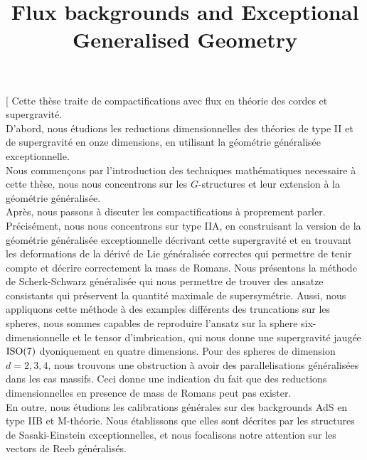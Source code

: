 \documentclass[draft]{phd}
\begin{document}
	\title[Solutions avec flux et Géométrie Généralisée Exceptionnelle]{Flux backgrounds and Exceptional Generalised Geometry}
	\abstract[%
			Cette thèse traite de compactifications avec flux en théorie des cordes et supergravité.\\
			D'abord, nous étudions les reductions dimensionnelles des théories de type II et de supergravité en onze dimensions, en utilisant la géométrie généralisée exceptionnelle.\\
			Nous commençons par l'introduction des techniques mathématiques necessaire à cette thèse, nous nous concentrons sur les $G$-structures et leur extension à la géométrie généralisée.\\
			Après, nous passons à discuter les compactifications à proprement parler.
			Précisément, nous nous concentrons sur type IIA, en construisant la version de la géométrie généralisée exceptionnelle décrivant cette supergravité et en trouvant les deformations de la dérivé de Lie généralisée correctes qui permettre de tenir compte et décrire correctement la mass de Romans.
			Nous présentons la méthode de Scherk-Schwarz généralisée qui nous permettre de trouver des ansatze consistants qui préservent la quantité maximale de supersymétrie.
			Aussi, nous appliquons cette méthode à des examples différents des truncations sur les spheres, nous sommes capables de reproduire l'ansatz sur la sphere six-dimensionnelle et le tensor d'imbrication, qui nous donne une supergravité jaugée $\mathrm{ISO}(7)$ dyoniquement  en quatre dimensions.
			Pour des spheres de dimension $d=2,3,4$, nous trouvons une obstruction à avoir des parallelisations généralisées dans les cas massifs. 
			Ceci donne une indication du fait que des reductions dimensionnelles en presence de mass de Romans peut pas exister.\\
			En outre, nous étudions les calibrations générales sur des backgrounds AdS en type IIB et M-théorie.
			Nous établissons que elles sont décrites par les structures de Sasaki-Einstein exceptionnelles, et nous focalisons notre attention sur les vectors de Reeb généralisés.
\end{document}
